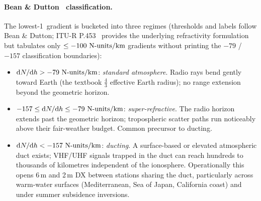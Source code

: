\documentclass[11pt,a4paper]{article}
\newcommand{\SI}[2]{#1\,\text{#2}}
\newcommand{\si}[1]{\text{#1}}
\newcommand{\km}{\text{km}}
\begin{document}
\paragraph{Bean \& Dutton~\cite{beandutton1968} classification.}
The lowest-\SI{1}{\km} gradient is bucketed into three regimes
(thresholds and labels follow Bean \& Dutton; ITU-R
P.453~\cite{itup453} provides the underlying refractivity
formulation but tabulates only $\le -100~\text{N-units}/\si{\km}$
gradients without printing the $-79$ / $-157$ classification
boundaries):
\begin{itemize}[nosep]
  \item $\mathrm{d}N/\mathrm{d}h > -79~\text{N-units}/\si{\km}$:
        \emph{standard atmosphere}.  Radio rays bend gently toward
        Earth (the textbook $\frac{4}{3}$ effective Earth radius);
        no range extension beyond the geometric horizon.
  \item $-157 \le \mathrm{d}N/\mathrm{d}h \le -79~\text{N-units}/\si{\km}$:
        \emph{super-refractive}.  The radio horizon extends past
        the geometric horizon; tropospheric scatter paths run
        noticeably above their fair-weather budget.  Common
        precursor to ducting.
  \item $\mathrm{d}N/\mathrm{d}h < -157~\text{N-units}/\si{\km}$:
        \emph{ducting}.  A surface-based or elevated atmospheric
        duct exists; VHF/UHF signals trapped in the duct can reach
        hundreds to thousands of kilometres independent of the
        ionosphere.  Operationally this opens 6\,m and 2\,m DX
        between stations sharing the duct, particularly across
        warm-water surfaces (Mediterranean, Sea of Japan,
        California coast) and under summer subsidence inversions.
\end{itemize}
\end{document}
